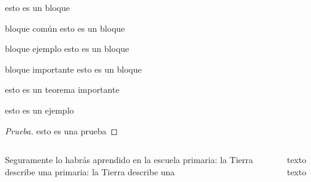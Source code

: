 \documentclass[utf8,spanish,xcolor={svgnames},14pt,handout]{beamer}
\begin{document}
\begin{frame}\transdissolve
\begin{block}{}
esto es un bloque
\end{block}

\begin{block}{bloque común}
	esto es un bloque
\end{block}

\begin{exampleblock}{bloque ejemplo}
	esto es un bloque
\end{exampleblock}

\begin{alertblock}{bloque importante}
	esto es un bloque
\end{alertblock}

\end{frame}

\begin{frame}\transsplitverticalout
\begin{theorem}[de Pitágoras]
	esto es un teorema importante
\end{theorem}

\begin{example}[de la clase]
	esto es un ejemplo
\end{example}

\begin{proof}[Prueba]
	esto es una prueba
\end{proof}
\end{frame}

\begin{frame}
\begin{columns}[b]
	\begin{column}{5cm}
		Seguramente lo habrás aprendido en la escuela primaria: la Tierra describe una primaria: la Tierra describe una
	\end{column}

    \begin{column}{5cm}
    	texto texto
    \end{column}
\end{columns}
\end{frame}
\end{document}
